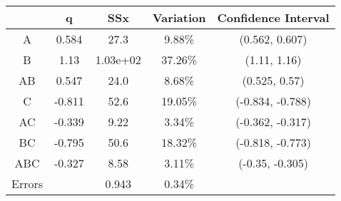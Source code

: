 \begin{center}
\begin{tabular}{|c|c|c|c|c|}
\cline{2-5}
\multicolumn{1}{c|}{} & q & SSx & Variation & Confidence Interval \\
\hline
A&0.584&27.3&9.88\% &(0.562, 0.607) \\
\hline
B&1.13&1.03e+02&37.26\% &(1.11, 1.16) \\
\hline
AB&0.547&24.0&8.68\% &(0.525, 0.57) \\
\hline
C&-0.811&52.6&19.05\% &(-0.834, -0.788) \\
\hline
AC&-0.339&9.22&3.34\% &(-0.362, -0.317) \\
\hline
BC&-0.795&50.6&18.32\% &(-0.818, -0.773) \\
\hline
ABC&-0.327&8.58&3.11\% &(-0.35, -0.305) \\
\hline
Errors& &0.943&0.34\% & \\
\hline
\end{tabular}
\end{center}
